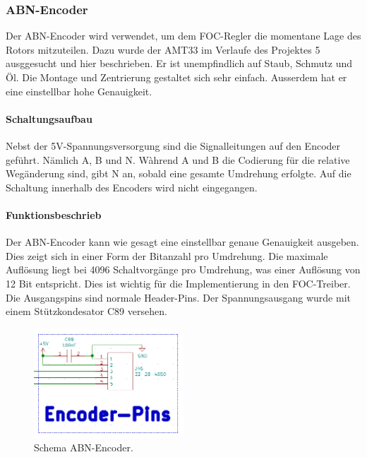 \subsubsection{ABN-Encoder}
\label{subsubsec:ABN-Encoder}

Der ABN-Encoder wird verwendet, um dem FOC-Regler die momentane Lage des Rotors mitzuteilen. Dazu wurde der AMT33 im Verlaufe des Projektes 5 ausggesucht und hier beschrieben. Er ist unempfindlich auf Staub, Schmutz und Öl. Die Montage und Zentrierung gestaltet sich sehr einfach. Ausserdem hat er eine einstellbar hohe Genauigkeit.

\paragraph{Schaltungsaufbau}\mbox{}

Nebst der 5V-Spannungsversorgung sind die Signalleitungen auf den Encoder geführt. Nämlich A, B und N. Wàhrend A und B die Codierung für die relative Wegänderung sind, gibt N an, sobald eine gesamte Umdrehung erfolgte. Auf die Schaltung innerhalb des Encoders wird nicht eingegangen.

\paragraph{Funktionsbeschrieb}\mbox{}

Der ABN-Encoder kann wie gesagt eine einstellbar genaue Genauigkeit ausgeben. Dies zeigt sich in einer Form der Bitanzahl pro Umdrehung. Die maximale Auflösung liegt bei 4096 Schaltvorgänge pro Umdrehung, was einer Auflösung von 12 Bit entspricht. Dies ist wichtig für die Implementierung in den FOC-Treiber. Die Ausgangspins sind normale Header-Pins. Der Spannungsausgang wurde mit einem Stützkondesator C89 versehen.

\begin{figure}[h!]
	\centering
	\includegraphics[width=0.5\textwidth]{graphics/Schema_ABN_Encoder}
	\caption{Schema ABN-Encoder.}
	\label{fig:Schema_ABN_Encoder}
\end{figure} 